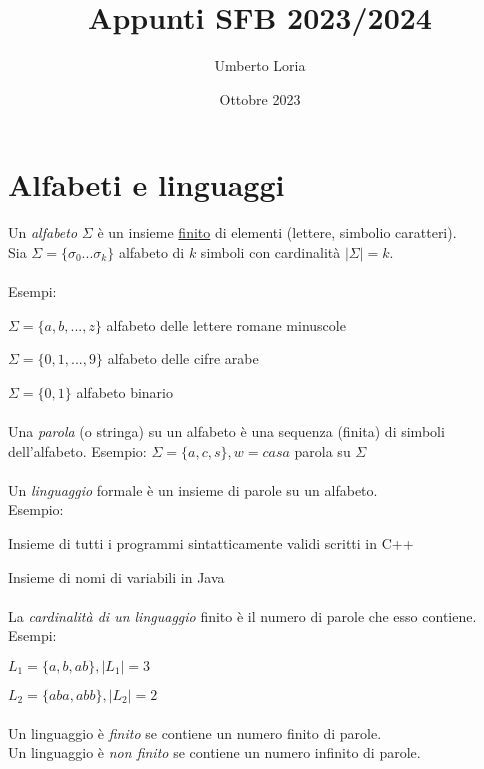 \documentclass[]{article}
\title{Appunti SFB 2023/2024}
\author{Umberto Loria}
\date{Ottobre 2023}
\begin{document}
\begin{titlepage}
\maketitle
\end{titlepage}

\tableofcontents{}
\newpage
\section{Alfabeti e linguaggi}

Un \textit{alfabeto} \mbox{$\Sigma$} è un insieme \underline{finito} di elementi (lettere, simbolio caratteri).
\\
Sia \mbox{$\Sigma=\{\sigma_0 ... \sigma_k\}$} alfabeto di \begin{math}k\end{math} simboli con cardinalità \mbox{$|\Sigma|=k$}.
\\
\\
Esempi:

\mbox{$\Sigma=\{a, b, ..., z\}$} alfabeto delle lettere romane minuscole

\mbox{$\Sigma=\{0, 1, ..., 9\}$} alfabeto delle cifre arabe

\mbox{$\Sigma=\{0, 1\}$} alfabeto binario
\\
\\
Una \textit{parola} (o stringa) su un alfabeto è una sequenza (finita) di simboli dell'alfabeto.
Esempio: \mbox{$\Sigma = \{a, c, s\}, w = casa$} parola su \mbox{$\Sigma$}
\\
\\
Un \textit{linguaggio} formale è un insieme di parole su un alfabeto.
\\
Esempio:

Insieme di tutti i programmi sintatticamente validi scritti in C++

Insieme di nomi di variabili in Java
\\
\\
La \textit{cardinalità di un linguaggio} finito è il numero di parole che esso contiene.
Esempi:

\mbox{$L_1=\{a, b, ab\}, |L_1|=3$}

\mbox{$L_2=\{aba, abb\}, |L_2|=2$}
\\
\\
Un linguaggio è \textit{finito} se contiene un numero finito di parole.
\\
Un linguaggio è \textit{non finito} se contiene un numero infinito di parole.
\end{document}
